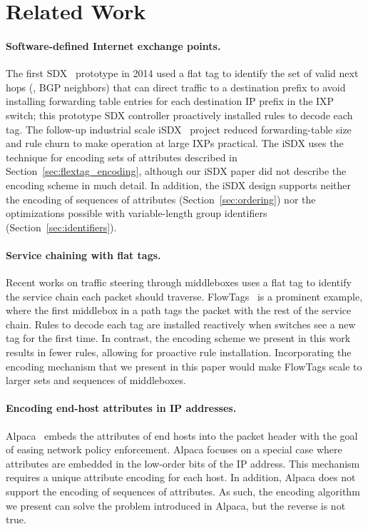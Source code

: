 \section{Related Work} 
\label{sec:related}

\paragraph{Software-defined Internet exchange points.} The first
SDX~\cite{sdx} prototype in 2014 used a flat tag to identify the set of
valid next hops (\ie, BGP neighbors) that can direct traffic to a
destination prefix to avoid installing forwarding table entries for each
destination IP prefix in the IXP switch; this prototype SDX controller
proactively installed rules to decode each tag.  The follow-up
industrial scale iSDX~\cite{isdx} project reduced forwarding-table size
and rule churn to make operation at large IXPs practical.  The iSDX uses
the technique for encoding sets of attributes described in
Section~\ref{sec:flextag_encoding}, although our iSDX paper did not
describe the encoding scheme in much detail.  In addition, the iSDX
design supports neither the encoding of {sequences} of attributes
(Section~\ref{sec:ordering}) nor the optimizations possible with
variable-length group identifiers (Section~\ref{sec:identifiers}).

\paragraph{Service chaining with flat tags.} Recent works on traffic
steering through middleboxes uses a flat tag to identify the service
chain each packet should traverse.  FlowTags~\cite{flowtags} is a
prominent example, where the first middlebox in a path tags the packet
with the rest of the service chain. Rules to decode each tag are
installed reactively when switches see a new tag for the first time.  In
contrast, the encoding scheme we present in this work results in fewer
rules, allowing for proactive rule installation.
Incorporating the encoding mechanism that we present in this paper would
make FlowTags scale to larger sets and sequences of middleboxes.

\paragraph{Encoding end-host attributes in IP addresses.}
Alpaca~\cite{alpaca} embeds the attributes of end hosts into the packet
header with the goal of easing network policy enforcement.  Alpaca
focuses on a special case where attributes are embedded in the low-order
bits of the IP address. This mechanism requires a unique attribute
encoding for each host.  In addition, Alpaca does not support the
encoding of sequences of attributes.  As such, the encoding algorithm we
present can solve the problem introduced in Alpaca, but the reverse is
not true.

